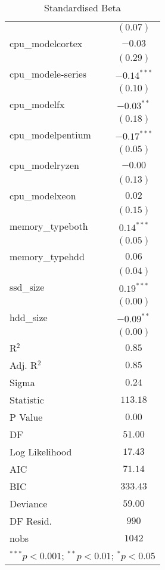 \documentclass[
]{article}
\begin{document}
\begin{table}
\begin{center}
\begin{tabular}{l c}
                              & $(0.07)$      \\
cpu\_modelcortex              & $-0.03$       \\
                              & $(0.29)$      \\
cpu\_modele-series            & $-0.14^{***}$ \\
                              & $(0.10)$      \\
cpu\_modelfx                  & $-0.03^{**}$  \\
                              & $(0.18)$      \\
cpu\_modelpentium             & $-0.17^{***}$ \\
                              & $(0.05)$      \\
cpu\_modelryzen               & $-0.00$       \\
                              & $(0.13)$      \\
cpu\_modelxeon                & $0.02$        \\
                              & $(0.15)$      \\
memory\_typeboth              & $0.14^{***}$  \\
                              & $(0.05)$      \\
memory\_typehdd               & $0.06$        \\
                              & $(0.04)$      \\
ssd\_size                     & $0.19^{***}$  \\
                              & $(0.00)$      \\
hdd\_size                     & $-0.09^{**}$  \\
                              & $(0.00)$      \\
\hline
R$^2$                         & $0.85$        \\
Adj. R$^2$                    & $0.85$        \\
Sigma                         & $0.24$        \\
Statistic                     & $113.18$      \\
P Value                       & $0.00$        \\
DF                            & $51.00$       \\
Log Likelihood                & $17.43$       \\
AIC                           & $71.14$       \\
BIC                           & $333.43$      \\
Deviance                      & $59.00$       \\
DF Resid.                     & $990$         \\
nobs                          & $1042$        \\
\hline
\multicolumn{2}{l}{\scriptsize{$^{***}p<0.001$; $^{**}p<0.01$; $^{*}p<0.05$}}
\end{tabular}
\caption{Standardised Beta}
\label{table:coefficients}
\end{center}
\end{table}
\end{document}
